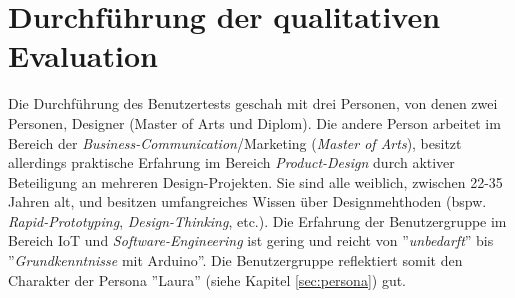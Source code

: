 \section{Durchführung der qualitativen Evaluation}

Die Durchführung des Benutzertests geschah mit drei Personen, von denen zwei Personen, Designer (Master of Arts und Diplom). Die andere Person arbeitet im Bereich der \textit{Business-Communication}/Marketing (\textit{Master of Arts}), besitzt allerdings praktische Erfahrung im Bereich \textit{Product-Design} durch aktiver Beteiligung an mehreren Design-Projekten. Sie sind alle weiblich, zwischen 22-35 Jahren alt, und besitzen umfangreiches Wissen über Designmehthoden (bspw. \textit{Rapid-Prototyping}, \textit{Design-Thinking}, etc.). Die Erfahrung der Benutzergruppe im Bereich \ac{IoT} und \textit{Soft\-ware-Engineering} ist gering und reicht von ''\textit{unbedarft}'' bis ''\textit{Grundkenntnisse} mit Arduino''. Die Benutzergruppe reflektiert somit den Charakter der Persona ''Laura'' (siehe Kapitel \ref{sec:persona}) gut.

